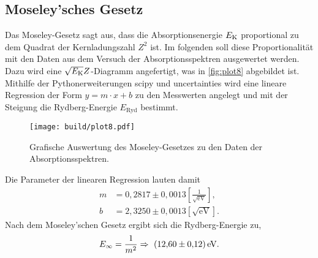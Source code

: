 \subsection{Moseley'sches Gesetz}
\label{subsec:moseley}

Das Moseley-Gesetz sagt aus, dass die Absorptionsenergie $E_{\text K}$ proportional zu dem Quadrat der Kernladungszahl $Z^2$ ist. Im folgenden soll diese
Proportionalität mit den Daten aus dem Versuch der Absorptionsspektren ausgewertet werden.
Dazu wird eine $\sqrt{E_{\text K}}Z$-Diagramm angefertigt, was in \autoref{fig:plot8} abgebildet ist. Mithilfe der Pythonerweiterungen scipy \cite{scipy} und uncertainties \cite{uncertainties} wird
eine lineare Regression der Form $y=m \cdot x +b$ zu den Messwerten angelegt und mit der Steigung die Rydberg-Energie $E_{\text{Ryd}}$ bestimmt.

\begin{figure}[H]
  \centering
  \texttt{[image: build/plot8.pdf]}
  \caption{Grafische Auswertung des Moseley-Gesetzes zu den Daten der Absorptionsspektren.}
  \label{fig:plot8}
\end{figure}

Die Parameter der linearen Regression lauten damit
\begin{align*}
  m &= 0,2817 \pm 0,0013 \left[\frac{1}{\sqrt{\text{eV}}}\right], \\
  b &= 2,3250 \pm 0,0013 \left[\sqrt{\text{eV}}\right].
\end{align*}
Nach dem Moseley'schen Gesetz ergibt sich die Rydberg-Energie zu,
\begin{align*}
  E_\infty = \frac{1}{m^2} \Rightarrow ~ \SI{12,60(0,12)}{\eV}.
\end{align*}